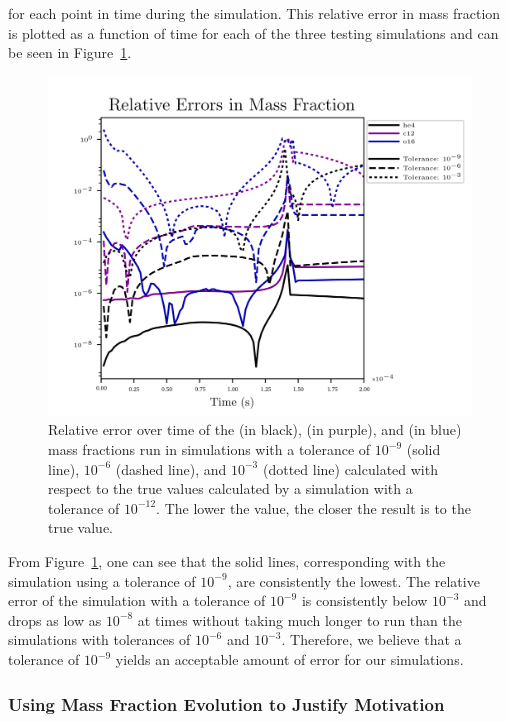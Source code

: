 \documentclass[preprint]{aastex62}
\begin{document}
      \noindent for each point in time during the simulation. This relative error in mass fraction is plotted as a function of time for each of the three testing simulations and can be seen in Figure~\ref{fig:relativeerror}.
    
      \begin{figure}
        \centering
        \includegraphics[width=5in]{images/react_aprox13_test13_ureca_tol-rel_xn1.png}
        \caption{Relative error over time of the  (in black),  (in purple), and  (in blue) mass fractions run in simulations with a tolerance of $10^{-9}$ (solid line), $10^{-6}$ (dashed line), and $10^{-3}$ (dotted line) calculated with respect to the true values calculated by a simulation with a tolerance of $10^{-12}$. The lower the value, the closer the result is to the true value.
          }
        \label{fig:relativeerror}
      \end{figure}  
  
      From Figure~\ref{fig:relativeerror}, one can see that the solid lines, corresponding with the simulation using a tolerance of $10^{-9}$, are consistently the lowest. The relative error of the simulation with a tolerance of $10^{-9}$ is consistently below $10^{-3}$ and drops as low as $10^{-8}$ at times without taking much longer to run than the simulations with tolerances of $10^{-6}$ and $10^{-3}$. Therefore, we believe that a tolerance of $10^{-9}$ yields an acceptable amount of error for our simulations.
  
    \subsubsection{Using Mass Fraction Evolution to Justify Motivation}
    
\end{document}
